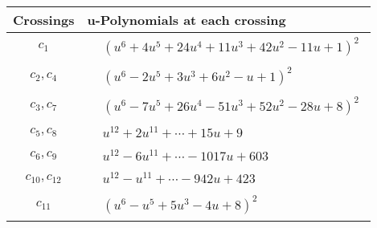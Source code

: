 \documentclass[1p]{elsarticle_modified}
\theoremstyle{definition}
\begin{document}
\begin{tabular}{m{50pt}|m{274pt}}
Crossings & \hspace{64pt}u-Polynomials at each crossing \\
\hline $$\begin{aligned}c_{1}\end{aligned}$$&$\begin{aligned}
&(u^6+4 u^5+24 u^4+11 u^3+42 u^2-11 u+1)^2
\end{aligned}$\\
\hline $$\begin{aligned}c_{2},c_{4}\end{aligned}$$&$\begin{aligned}
&(u^6-2 u^5+3 u^3+6 u^2- u+1)^2
\end{aligned}$\\
\hline $$\begin{aligned}c_{3},c_{7}\end{aligned}$$&$\begin{aligned}
&(u^6-7 u^5+26 u^4-51 u^3+52 u^2-28 u+8)^2
\end{aligned}$\\
\hline $$\begin{aligned}c_{5},c_{8}\end{aligned}$$&$\begin{aligned}
&u^{12}+2 u^{11}+\cdots+15 u+9
\end{aligned}$\\
\hline $$\begin{aligned}c_{6},c_{9}\end{aligned}$$&$\begin{aligned}
&u^{12}-6 u^{11}+\cdots-1017 u+603
\end{aligned}$\\
\hline $$\begin{aligned}c_{10},c_{12}\end{aligned}$$&$\begin{aligned}
&u^{12}- u^{11}+\cdots-942 u+423
\end{aligned}$\\
\hline $$\begin{aligned}c_{11}\end{aligned}$$&$\begin{aligned}
&(u^6- u^5+5 u^3-4 u+8)^2
\end{aligned}$\\
\hline
\end{tabular}\\~\\
\newpage\renewcommand{\arraystretch}{1}
\end{document}
